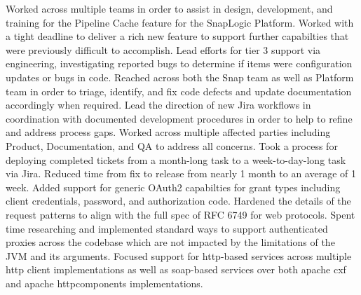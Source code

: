 \resumeCompanyStart
\resumeCompanyEnd
\resumeItemListStart
    {
        Worked across multiple teams in order to assist in design, development, and training for the Pipeline Cache feature for the SnapLogic Platform.
        Worked with a tight deadline to deliver a rich new feature to support further capabilties that were previously difficult to accomplish.
    }
    {
        Lead efforts for tier 3 support via engineering, investigating reported bugs to determine if items were configuration updates or bugs in code.
        Reached across both the Snap team as well as Platform team in order to triage, identify, and fix code defects and update documentation accordingly when required.
    }
    {
        Lead the direction of new Jira workflows in coordination with documented development procedures in order to help to refine and address process gaps.
        Worked across multiple affected parties including Product, Documentation, and QA to address all concerns.
    }
    {
        Took a process for deploying completed tickets from a month-long task to a week-to-day-long task via Jira.
        Reduced time from fix to release from nearly 1 month to an average of 1 week.
    }
\resumeItemListEnd
\resumeCompanyStart
\resumeCompanyEnd
\resumeItemListStart
    {
        Added support for generic OAuth2 capabilties for grant types including client credentials, password, and authorization code.
        Hardened the details of the request patterns to align with the full spec of RFC 6749 for web protocols.
    }
    {
        Spent time researching and implemented standard ways to support authenticated proxies across the codebase which are not impacted by the limitations of the JVM and its arguments.
        Focused support for http-based services across multiple http client implementations as well as soap-based services over both apache cxf and apache httpcomponents implementations.
    }
\resumeItemListEnd